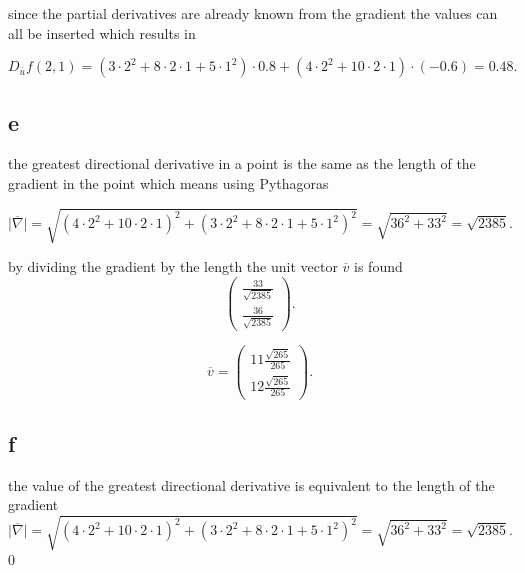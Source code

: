 \documentclass[12pt,a4paper]{article}
\begin{document}
since the partial derivatives are already known from the gradient the values can all be inserted which results in

\[
	D_{\overline{u}}f(2,1)=(3\cdot 2^2 + 8\cdot 2\cdot 1 + 5\cdot 1^2)\cdot 0.8+( 4\cdot 2^2 + 10\cdot 2\cdot 1)\cdot  (-0.6)=0.48
.\] 



\subsection{e}

the greatest directional derivative in a point is the same as the length of the gradient in the point which means using Pythagoras 

\[
 \mid \overline{\nabla } \mid = \sqrt{\left(4\cdot 2^{2} + 10 \cdot 2\cdot  1\right)^{2} + \left(3 \cdot 2^{2} + 8\cdot 2\cdot 1 + 5\cdot  1^{2}\right)^{2}}=\sqrt{36^2+33^2}=\sqrt{2385}  
.\] 

by dividing the gradient by the length the unit vector $\overline{v}$ is found \[
\begin{pmatrix} \frac{33}{ \sqrt{2385}}\\ \frac{36}{ \sqrt{2385}} \end{pmatrix}
.\] 

\[
\overline{v}= \begin{pmatrix} 11\frac{\sqrt{265}}{265}\\
12\frac{\sqrt{265}}{265} \end{pmatrix}
.\] 

\subsection{f} 

the value of the greatest directional derivative is equivalent to the length of the gradient
\[
  \mid \overline{\nabla } \mid = \sqrt{\left(4\cdot 2^{2} + 10 \cdot 2\cdot  1\right)^{2} + \left    (3 \cdot 2^{2} + 8\cdot 2\cdot 1 + 5\cdot  1^{2}\right)^{2}}=\sqrt{36^2+33^2}=\sqrt{2385} 
.\] 0
\end{document}
